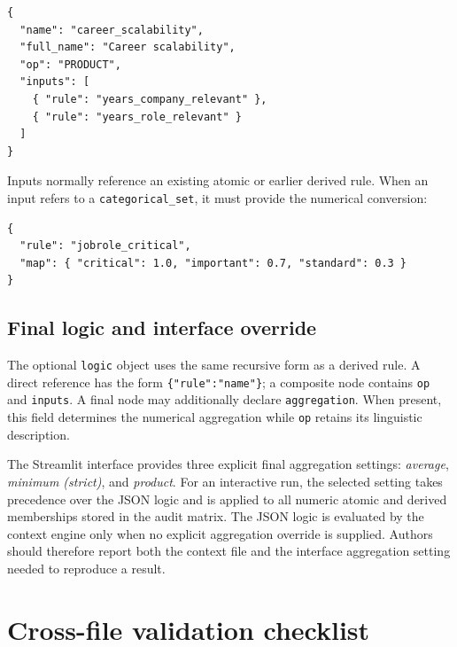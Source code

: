 \documentclass[11pt,a4paper]{article}
\begin{document}
\begin{lstlisting}[style=json]
{
  "name": "career_scalability",
  "full_name": "Career scalability",
  "op": "PRODUCT",
  "inputs": [
    { "rule": "years_company_relevant" },
    { "rule": "years_role_relevant" }
  ]
}
\end{lstlisting}

Inputs normally reference an existing atomic or earlier derived rule. When an input refers to a \texttt{categorical\_set}, it must provide the numerical conversion:
\begin{lstlisting}[style=json]
{
  "rule": "jobrole_critical",
  "map": { "critical": 1.0, "important": 0.7, "standard": 0.3 }
}
\end{lstlisting}

\subsection{Final logic and interface override}

The optional \texttt{logic} object uses the same recursive form as a derived rule. A direct reference has the form \texttt{\{"rule":"name"\}}; a composite node contains \texttt{op} and \texttt{inputs}. A final node may additionally declare \texttt{aggregation}. When present, this field determines the numerical aggregation while \texttt{op} retains its linguistic description.

The Streamlit interface provides three explicit final aggregation settings: \textit{average}, \textit{minimum (strict)}, and \textit{product}. For an interactive run, the selected setting takes precedence over the JSON logic and is applied to all numeric atomic and derived memberships stored in the audit matrix. The JSON logic is evaluated by the context engine only when no explicit aggregation override is supplied. Authors should therefore report both the context file and the interface aggregation setting needed to reproduce a result.

\section{Cross-file validation checklist}
\end{document}

